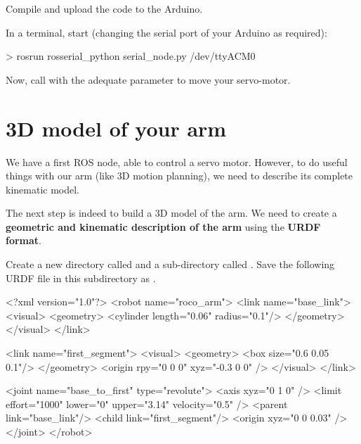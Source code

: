 \documentclass{instructions}
\begin{document}

Compile and upload the code to the Arduino.

In a terminal, start  (changing the serial port of your Arduino as
required):

\begin{shcode}
> rosrun rosserial_python serial_node.py /dev/ttyACM0
\end{shcode}

Now, call  with the adequate parameter to move your servo-motor.

\part{3D model of your arm}

We have a first ROS node, able to control a servo motor. However, to do useful
things with our arm (like 3D motion planning), we need to describe its complete
kinematic model.

The next step is indeed to build a 3D model of the arm. We need to create a
\textbf{geometric and kinematic description of the arm} using the \textbf{URDF
format}.


Create a new directory called  and a sub-directory called
. Save the following URDF file in this subdirectory as
.


\begin{xmlcode}
<?xml version="1.0"?>
<robot name="roco_arm">
  <link name="base_link">
    <visual>
      <geometry>
        <cylinder length="0.06" radius="0.1"/>
      </geometry>
    </visual>
  </link>

  <link name="first_segment">
    <visual>
      <geometry>
        <box size="0.6 0.05 0.1"/>
      </geometry>
      <origin rpy="0 0 0" xyz="-0.3 0 0" />
    </visual>
  </link>

  <joint name="base_to_first" type="revolute">
    <axis xyz="0 1 0" />
    <limit effort="1000" lower="0"
                    upper="3.14" velocity="0.5" />
    <parent link="base_link"/>
    <child link="first_segment"/>
    <origin xyz="0 0 0.03" />
  </joint>
</robot>
\end{xmlcode}
\end{document}
